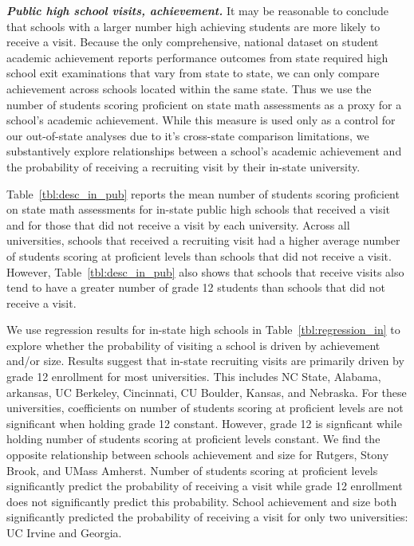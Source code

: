\documentclass[twoside]{article}
\begin{document}
\textbf{\textit{Public high school visits, achievement.}} It may be reasonable to conclude that schools with a larger number high achieving students are more likely to receive a visit. Because the only comprehensive, national dataset on student academic achievement reports performance outcomes from state required high school exit examinations that vary from state to state, we can only compare achievement across schools located within the same state. Thus we use the number of students scoring proficient on state math assessments as a proxy for a school's academic achievement. While this measure is used only as a control for our out-of-state analyses due to it's cross-state comparison limitations, we substantively explore relationships between a school's academic achievement and the probability of receiving a recruiting visit by their in-state university.  

Table~\ref{tbl:desc_in_pub} reports the mean number of students scoring proficient on state math assessments for in-state public high schools that received a visit and for those that did not receive a visit by each university. Across all universities, schools that received a recruiting visit had a higher average number of students scoring at proficient levels than schools that did not receive a visit. However, Table~\ref{tbl:desc_in_pub} also shows that schools that receive visits also tend to have a greater number of grade 12 students than schools that did not receive a visit.

We use regression results for in-state high schools in Table~\ref{tbl:regression_in} to explore whether the probability of visiting a school is driven by achievement and/or size. Results suggest that in-state recruiting visits are primarily driven by grade 12 enrollment for most universities. This includes NC State, Alabama, arkansas, UC Berkeley, Cincinnati, CU Boulder, Kansas, and Nebraska. For these universities, coefficients on number of students scoring at proficient levels are not significant when holding grade 12 constant. However,  grade 12 is signficant while holding number of students scoring at proficient levels constant. We find the opposite relationship between schools achievement and size for Rutgers, Stony Brook, and UMass Amherst. Number of students scoring at proficient levels significantly predict the probability of receiving a visit while grade 12 enrollment does not significantly predict this probability. School achievement and size both significantly predicted the probability of receiving a visit for only two universities: UC Irvine and Georgia.
\end{document}
